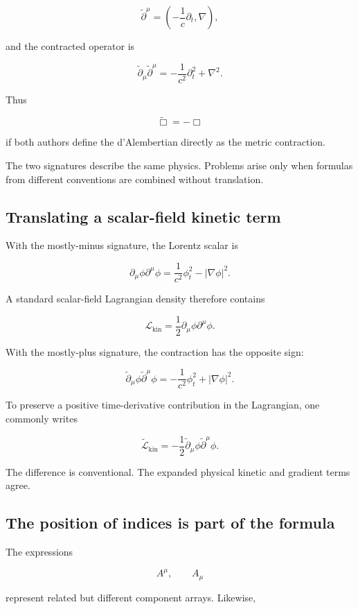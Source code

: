 \[
\widetilde{\partial}^{\mu}
=
\left(
-\frac{1}{c}\partial_{t},
\nabla
\right),
\]

and the contracted operator is

\[
\widetilde{\partial}_{\mu}
\widetilde{\partial}^{\mu}
=
-\frac{1}{c^{2}}\partial_{t}^{2}
+
\nabla^{2}.
\]

Thus

\[
\widetilde{\Box}=-\Box
\]

if both authors define the d'Alembertian directly as the metric contraction.

The two signatures describe the same physics. Problems arise only when formulas from different conventions are combined without translation.

\subsection{Translating a scalar-field kinetic term}

With the mostly-minus signature, the Lorentz scalar is

\[
\partial_{\mu}\phi\partial^{\mu}\phi
=
\frac{1}{c^{2}}\phi_{t}^{2}
-
|\nabla\phi|^{2}.
\]

A standard scalar-field Lagrangian density therefore contains

\[
\mathcal{L}_{\mathrm{kin}}
=
\frac{1}{2}
\partial_{\mu}\phi\partial^{\mu}\phi.
\]

With the mostly-plus signature, the contraction has the opposite sign:

\[
\widetilde{\partial}_{\mu}\phi
\widetilde{\partial}^{\mu}\phi
=
-
\frac{1}{c^{2}}\phi_{t}^{2}
+
|\nabla\phi|^{2}.
\]

To preserve a positive time-derivative contribution in the Lagrangian, one commonly writes

\[
\widetilde{\mathcal{L}}_{\mathrm{kin}}
=
-\frac{1}{2}
\widetilde{\partial}_{\mu}\phi
\widetilde{\partial}^{\mu}\phi.
\]

The difference is conventional. The expanded physical kinetic and gradient terms agree.

\subsection{The position of indices is part of the formula}

The expressions

\[
A^{\mu},
\qquad
A_{\mu}
\]

represent related but different component arrays. Likewise,

